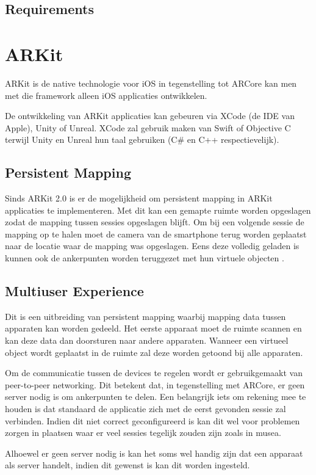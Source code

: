 \subsection{Requirements}
\section{ARKit}
ARKit is de native technologie voor iOS in tegenstelling tot ARCore kan men met die framework alleen iOS applicaties ontwikkelen.

De ontwikkeling van ARKit applicaties kan gebeuren via XCode (de IDE van Apple), Unity of Unreal. XCode zal gebruik maken van Swift of Objective C terwijl Unity en Unreal hun taal gebruiken (C\# en C++ respectievelijk).

\subsection{Persistent Mapping}
Sinds ARKit 2.0 is er de mogelijkheid om persistent mapping in ARKit applicaties te implementeren. Met dit kan een gemapte ruimte worden opgeslagen zodat de mapping tussen sessies opgeslagen blijft.
Om bij een volgende sessie de mapping op te halen moet de camera van de smartphone terug worden geplaatst naar de locatie waar de mapping was opgeslagen. Eens deze volledig geladen is kunnen ook de ankerpunten worden teruggezet met hun virtuele objecten \autocite{ARKitPersistent}.

\subsection{Multiuser Experience}
Dit is een uitbreiding van persistent mapping waarbij mapping data tussen apparaten kan worden gedeeld. Het eerste apparaat moet de ruimte scannen en kan deze data dan doorsturen naar andere apparaten. Wanneer een virtueel object wordt geplaatst in de ruimte zal deze worden getoond bij alle apparaten.

Om de communicatie tussen de devices te regelen wordt er gebruikgemaakt van peer-to-peer networking. Dit betekent dat, in tegenstelling met ARCore, er geen server nodig is om ankerpunten te delen. Een belangrijk iets om rekening mee te houden is dat standaard de applicatie zich met de eerst gevonden sessie zal verbinden. Indien dit niet correct geconfigureerd is kan dit wel voor problemen zorgen in plaatsen waar er veel sessies tegelijk zouden zijn zoals in musea.

Alhoewel er geen server nodig is kan het soms wel handig zijn dat een apparaat als server handelt, indien dit gewenst is kan dit worden ingesteld.

